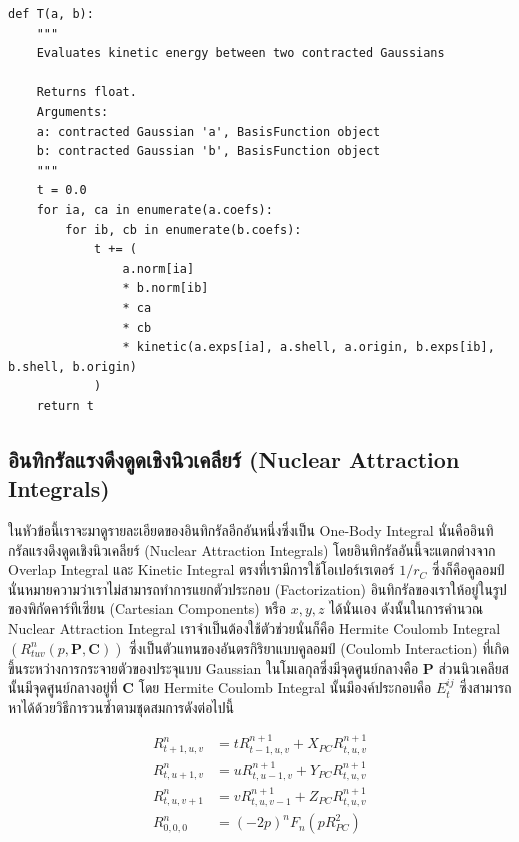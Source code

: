 \begin{lstlisting}[style=MyPython]
def T(a, b):
    """
    Evaluates kinetic energy between two contracted Gaussians

    Returns float.
    Arguments:
    a: contracted Gaussian 'a', BasisFunction object
    b: contracted Gaussian 'b', BasisFunction object
    """
    t = 0.0
    for ia, ca in enumerate(a.coefs):
        for ib, cb in enumerate(b.coefs):
            t += (
                a.norm[ia]
                * b.norm[ib]
                * ca
                * cb
                * kinetic(a.exps[ia], a.shell, a.origin, b.exps[ib], b.shell, b.origin)
            )
    return t
\end{lstlisting}

\subsection{อินทิกรัลแรงดึงดูดเชิงนิวเคลียร์ (Nuclear Attraction Integrals)}

ในหัวข้อนี้เราจะมาดูรายละเอียดของอินทิกรัลอีกอันหนึ่งซึ่งเป็น One-Body Integral นั่นคืออินทิกรัลแรงดึงดูดเชิงนิวเคลียร์ (Nuclear Attraction
Integrals) โดยอินทิกรัลอันนี้จะแตกต่างจาก Overlap Integral และ Kinetic Integral ตรงที่เรามีการใช้โอเปอร์เรเตอร์ $1/r_C$
ซึ่งก็คือคูลอมป์ นั่นหมายความว่าเราไม่สามารถทำการแยกตัวประกอบ (Factorization) อินทิกรัลของเราให้อยู่ในรูปของพิกัดคาร์ทีเซียน
(Cartesian Components) หรือ $x,y,z$ ได้นั่นเอง ดังนั้นในการคำนวณ Nuclear Attraction Integral เราจำเป็นต้องใช้ตัวช่วยนั่นก็คือ
Hermite Coulomb Integral $(R^n_{tuv}(p,\mathbf{P},\mathbf{C}))$ ซึ่งเป็นตัวแทนของอันตรกิริยาแบบคูลอมป์ (Coulomb Interaction)
ที่เกิดขึ้นระหว่างการกระจายตัวของประจุแบบ Gaussian ในโมเลกุลซึ่งมีจุดศูนย์กลางคือ $\mathbf{P}$ ส่วนนิวเคลียสนั้นมีจุดศูนย์กลางอยู่ที่
$\mathbf{C}$ โดย Hermite Coulomb Integral นั้นมีองค์ประกอบคือ $E_t^{ij}$ ซึ่งสามารถหาได้ด้วยวิธีการวนซ้ำตามชุดสมการดังต่อไปนี้

\begin{align}
  R^{n}_{t+1,u,v} & = t R^{n+1}_{t-1,u,v} + X_{PC}R^{n+1}_{t,u,v} \\
  R^{n}_{t,u+1,v} & = u R^{n+1}_{t,u-1,v} + Y_{PC}R^{n+1}_{t,u,v} \\
  R^{n}_{t,u,v+1} & = v R^{n+1}_{t,u,v-1} + Z_{PC}R^{n+1}_{t,u,v} \\
  R^{n}_{0,0,0}   & = (-2p)^n F_n (p R_{PC}^2)
\end{align}

